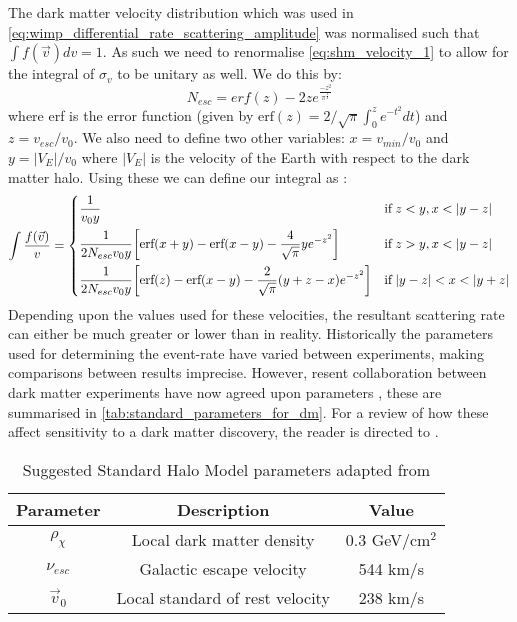 \par
The dark matter velocity distribution which was used in \autoref{eq:wimp_differential_rate_scattering_amplitude} was normalised such that $\int f(\vec{v}) dv = 1$.
As such we need to renormalise \autoref{eq:shm_velocity_1} to allow for the integral of $\sigma_{v}$ to be unitary as well.
We do this by:
\begin{equation}
    N_{esc} = erf(z) - 2z e^\frac{-z^2}{\pi^{\frac{1}{2}}}
\end{equation}
where erf is the error function (given by $\text{erf}(z) = 2/\sqrt{\pi}\int^{z}_{0} e^{-t^2} dt$) and $z=v_{esc}/v_0$.
We also need to define two other variables: $x=v_{min}/v_{0}$ and $y=|V_E|/v_0$ where $|V_E|$ is the velocity of the Earth with respect to the dark matter halo.
Using these we can define our integral as \cite{shm_derivation_ref}:
\begin{equation}
\begin{split}
 \int \frac{f(\vec{v})}{v} = 
\begin{dcases}
\frac{1}{v_0 y}  & \text{if}\; z<y,x<|y-z| \\
\frac{1}{2N_{esc} v_{0}y} \bigg[\text{erf}(x+y) - \text{erf}(x-y) - \frac{4}{\sqrt{\pi}}ye^{-z^2} \bigg] & \text{if}\; z>y, x<|y-z| \\
\frac{1}{2N_{esc} v_{0}y} \bigg[\text{erf}(z) - \text{erf}(x-y) - \frac{2}{\sqrt{\pi}}(y + z - x)e^{-z^2} \bigg] & \text{if}\; |y-z|<x<|y+z|
\end{dcases}
\end{split}
\label{eq:shm_velocity_2}
\end{equation}
Depending upon the values used for these velocities, the resultant scattering rate can either be much greater or lower than in reality.
Historically the parameters used for determining the event-rate have varied between experiments, making comparisons between results imprecise.
However, resent collaboration between dark matter experiments have now agreed upon parameters \cite{standard_halo_model_conventions_ref}, these are summarised in \autoref{tab:standard_parameters_for_dm}.
For a review of how these affect sensitivity to a dark matter discovery, the reader is directed to \cite{dm_velocity_effects_on_limits_ref}.

\begin{table}[!htbp]
    \centering
    \begin{tabular}{c|c|c}
        Parameter                               & Description                       & Value         \\ \hline
        $\rho_{\chi}$                           & Local dark matter density         & 0.3 GeV/cm$^2$ \cite{shm_derivation_ref}           \\
        $\nu_{esc}$                             & Galactic escape velocity          & 544 km/s  \cite{dm_v_esc_ref}           \\
        $\Vec{v}_0$                             & Local standard of rest velocity   & 238 km/s   \cite{dm_v_0_ref}           
    \end{tabular}
    \caption{Suggested Standard Halo Model parameters adapted from \cite{standard_halo_model_conventions_ref}}
    \label{tab:standard_parameters_for_dm}
\end{table}

